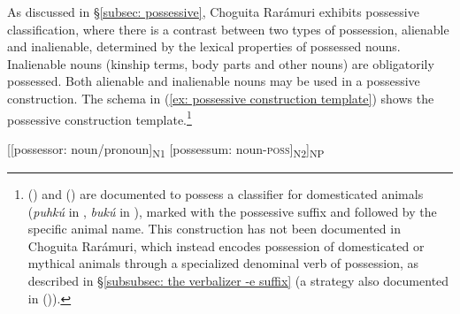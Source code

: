     \z
\z

As discussed in §\ref{subsec: possessive}, Choguita Rarámuri exhibits possessive classification, where there is a contrast between two types of possession, alienable and inalienable, determined by the lexical properties of possessed nouns. Inalienable nouns (kinship terms, body parts and other nouns) are obligatorily possessed. Both alienable and inalienable nouns may be used in a possessive construction. The schema in (\ref{ex: possessive construction template}) shows the possessive construction template.\footnote{ (\citealt{miller1996guarijio}) and  (\citealt{brambila1953gramatica, brambila1976diccionario}) are documented to possess a classifier for domesticated animals (\textit{puhkú} in , \textit{bukú} in ), marked with the possessive suffix and followed by the specific animal name. This construction has not been documented in Choguita Rarámuri, which instead encodes possession of domesticated or mythical animals through a specialized denominal verb of possession, as described in §\ref{subsubsec: the verbalizer -e suffix} (a strategy also documented in  (\citealt[149]{miller1996guarijio})).}

\ea\label{ex: possessive construction template}

[[possessor: noun/pronoun]\textsubscript{N1} [possessum: noun-\textsc{poss}]\textsubscript{N2}]\textsubscript{NP}

\z

